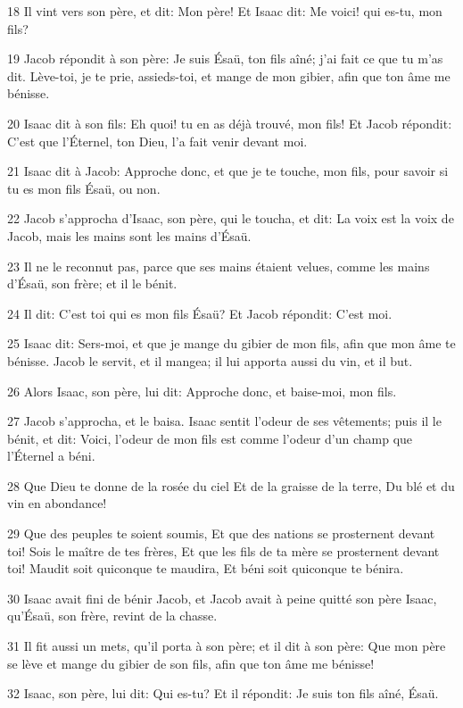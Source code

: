 \par 18 Il vint vers son père, et dit: Mon père! Et Isaac dit: Me voici! qui es-tu, mon fils?
\par 19 Jacob répondit à son père: Je suis Ésaü, ton fils aîné; j'ai fait ce que tu m'as dit. Lève-toi, je te prie, assieds-toi, et mange de mon gibier, afin que ton âme me bénisse.
\par 20 Isaac dit à son fils: Eh quoi! tu en as déjà trouvé, mon fils! Et Jacob répondit: C'est que l'Éternel, ton Dieu, l'a fait venir devant moi.
\par 21 Isaac dit à Jacob: Approche donc, et que je te touche, mon fils, pour savoir si tu es mon fils Ésaü, ou non.
\par 22 Jacob s'approcha d'Isaac, son père, qui le toucha, et dit: La voix est la voix de Jacob, mais les mains sont les mains d'Ésaü.
\par 23 Il ne le reconnut pas, parce que ses mains étaient velues, comme les mains d'Ésaü, son frère; et il le bénit.
\par 24 Il dit: C'est toi qui es mon fils Ésaü? Et Jacob répondit: C'est moi.
\par 25 Isaac dit: Sers-moi, et que je mange du gibier de mon fils, afin que mon âme te bénisse. Jacob le servit, et il mangea; il lui apporta aussi du vin, et il but.
\par 26 Alors Isaac, son père, lui dit: Approche donc, et baise-moi, mon fils.
\par 27 Jacob s'approcha, et le baisa. Isaac sentit l'odeur de ses vêtements; puis il le bénit, et dit: Voici, l'odeur de mon fils est comme l'odeur d'un champ que l'Éternel a béni.
\par 28 Que Dieu te donne de la rosée du ciel Et de la graisse de la terre, Du blé et du vin en abondance!
\par 29 Que des peuples te soient soumis, Et que des nations se prosternent devant toi! Sois le maître de tes frères, Et que les fils de ta mère se prosternent devant toi! Maudit soit quiconque te maudira, Et béni soit quiconque te bénira.
\par 30 Isaac avait fini de bénir Jacob, et Jacob avait à peine quitté son père Isaac, qu'Ésaü, son frère, revint de la chasse.
\par 31 Il fit aussi un mets, qu'il porta à son père; et il dit à son père: Que mon père se lève et mange du gibier de son fils, afin que ton âme me bénisse!
\par 32 Isaac, son père, lui dit: Qui es-tu? Et il répondit: Je suis ton fils aîné, Ésaü.
